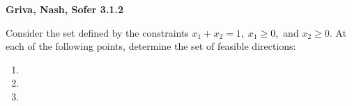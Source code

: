 \textbf{Griva, Nash, Sofer 3.1.2}

Consider the set defined by the constraints $x_1 + x_2 = 1,\; x_1 \ge 0,$ and $x_2 \ge 0$. 
At each of the following points, determine the set of feasible directions:

\begin{enumerate}
  \item 
  \item 
  \item 
\end{enumerate}